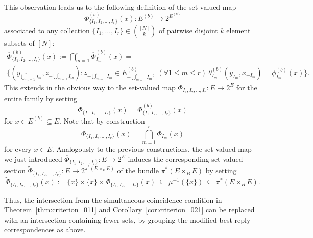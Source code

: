 \documentclass[a4paper,11pt,reqno,english]{amsart}
\theoremstyle{plain}
\theoremstyle{definition}
\begin{document}
\medskip
This observation leads us to the following definition of the set-valued map
\[
	\overline{\Phi}_{\{I_1,I_2,\dots,I_r\}}^{(b)}(x) \colon E^{(b)}\longrightarrow 2^{E^{(b)}}
\]
associated to any collection $\{I_1, \dots, I_r\}\in\binom{[N]}{k}$ of pairwise disjoint $k$ element subsets of $[N]$:
\begin{multline*}
	\overline{\Phi}_{\{I_1,I_2,\dots,I_r\}}^{(b)}(x) := \bigcap_{m=1}^{r} \overline{\Phi}_{I_m}^{(b)}(x) = \\ \big\{(y_{\bigcup_{m=1}^r I_m}, z_{-\bigcup_{m=1}^r I_m}) : z_{-\bigcup_{m=1}^r I_m} \in E^{(b)}_{-\bigcup_{m=1}^r I_m}, \ (\forall 1 \leq m \leq r) \ \theta_{I_m}^{(b)}(y_{I_m}, x_{-I_m}) = \phi_{I_m}^{(b)}(x)\big\}.
\end{multline*}
This extends in the obvious way to the set-valued map $\overline{\Phi}_{I_1,I_2,\dots,I_r}\colon E \longrightarrow 2^{E}$ for the entire family by setting
\begin{displaymath}
	\overline{\Phi}_{\{I_1,I_2,\dots,I_r\}}(x) = \overline{\Phi}_{\{I_1,I_2,\dots,I_r\}}^{(b)}(x)
\end{displaymath}
for $x \in E^{(b)}\subseteq E$.
Note that by construction
\[
	\overline{\Phi}_{\{I_1,I_2,\dots,I_r\}}(x) = \bigcap_{m=1}^r \overline{\Phi}_{I_m}(x)
\]
for every $x\in E$.
Analogously to the previous constructions, the set-valued map we just introduced $\overline{\Phi}_{\{I_1,I_2,\dots,I_r\}}\colon E \longrightarrow 2^{E}$ induces the corresponding set-valued section $\widetilde{\Phi}_{\{I_1,I_2,\dots,I_r\}}\colon E\longrightarrow 2^{\pi^*(E\times_B E)}$ of the bundle $\pi^*(E\times_B E)$ by setting
\begin{displaymath}
	\widetilde{\Phi}_{\{I_1,I_2,\dots,I_r\}} (x):= \{x\}\times\{x\}\times  \overline{\Phi}_{\{I_1,I_2,\dots,I_r\}}(x) \ \subseteq \ \mu^{-1}(\{x\})  \ \subseteq \ \pi^*(E\times_B E).
\end{displaymath}

\medskip
Thus, the intersection from the simultaneous coincidence condition in Theorem~\ref{thm:criterion_011} and Corollary~\ref{cor:criterion_021} can be replaced with an intersection containing fewer sets, by grouping the modified best-reply correspondences as above.
\end{document}
